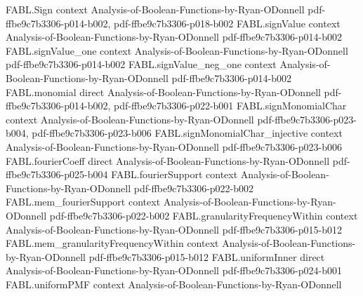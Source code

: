 \begin{theorem}
\label{FABL.FiniteFourierBasis.productNoiseStability_eq_sum_degree_weight}
\leanok
{}
\proofstep
  {FABL.Sign}
  {context}
  {Analysis-of-Boolean-Functions-by-Ryan-ODonnell}
  {pdf-ffbe9c7b3306-p014-b002,
    pdf-ffbe9c7b3306-p018-b002}
\proofstep
  {FABL.signValue}
  {context}
  {Analysis-of-Boolean-Functions-by-Ryan-ODonnell}
  {pdf-ffbe9c7b3306-p014-b002}
\proofstep
  {FABL.signValue_one}
  {context}
  {Analysis-of-Boolean-Functions-by-Ryan-ODonnell}
  {pdf-ffbe9c7b3306-p014-b002}
\proofstep
  {FABL.signValue_neg_one}
  {context}
  {Analysis-of-Boolean-Functions-by-Ryan-ODonnell}
  {pdf-ffbe9c7b3306-p014-b002}
\proofstep
  {FABL.monomial}
  {direct}
  {Analysis-of-Boolean-Functions-by-Ryan-ODonnell}
  {pdf-ffbe9c7b3306-p014-b002,
    pdf-ffbe9c7b3306-p022-b001}
\proofstep
  {FABL.signMonomialChar}
  {context}
  {Analysis-of-Boolean-Functions-by-Ryan-ODonnell}
  {pdf-ffbe9c7b3306-p023-b004,
    pdf-ffbe9c7b3306-p023-b006}
\proofstep
  {FABL.signMonomialChar_injective}
  {context}
  {Analysis-of-Boolean-Functions-by-Ryan-ODonnell}
  {pdf-ffbe9c7b3306-p023-b006}
\proofstep
  {FABL.fourierCoeff}
  {direct}
  {Analysis-of-Boolean-Functions-by-Ryan-ODonnell}
  {pdf-ffbe9c7b3306-p025-b004}
\proofstep
  {FABL.fourierSupport}
  {context}
  {Analysis-of-Boolean-Functions-by-Ryan-ODonnell}
  {pdf-ffbe9c7b3306-p022-b002}
\proofstep
  {FABL.mem_fourierSupport}
  {context}
  {Analysis-of-Boolean-Functions-by-Ryan-ODonnell}
  {pdf-ffbe9c7b3306-p022-b002}
\proofstep
  {FABL.granularityFrequencyWithin}
  {context}
  {Analysis-of-Boolean-Functions-by-Ryan-ODonnell}
  {pdf-ffbe9c7b3306-p015-b012}
\proofstep
  {FABL.mem_granularityFrequencyWithin}
  {context}
  {Analysis-of-Boolean-Functions-by-Ryan-ODonnell}
  {pdf-ffbe9c7b3306-p015-b012}
\proofstep
  {FABL.uniformInner}
  {direct}
  {Analysis-of-Boolean-Functions-by-Ryan-ODonnell}
  {pdf-ffbe9c7b3306-p024-b001}
\proofstep
  {FABL.uniformPMF}
  {context}
  {Analysis-of-Boolean-Functions-by-Ryan-ODonnell}

\end{theorem}
